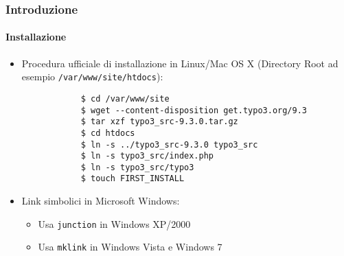 \begin{frame}[fragile]
	\frametitle{Introduzione}
	\framesubtitle{Installazione}

	\begin{itemize}
		\item Procedura ufficiale di installazione in Linux/Mac OS X\newline
			(Directory Root ad esempio \texttt{/var/www/site/htdocs}):
		\begin{lstlisting}
			$ cd /var/www/site
			$ wget --content-disposition get.typo3.org/9.3
			$ tar xzf typo3_src-9.3.0.tar.gz
			$ cd htdocs
			$ ln -s ../typo3_src-9.3.0 typo3_src
			$ ln -s typo3_src/index.php
			$ ln -s typo3_src/typo3
			$ touch FIRST_INSTALL
		\end{lstlisting}

		\item Link simbolici in Microsoft Windows:

			\begin{itemize}
				\item Usa \texttt{junction} in Windows XP/2000
				\item Usa \texttt{mklink} in Windows Vista e Windows 7
			\end{itemize}

	\end{itemize}
\end{frame}

